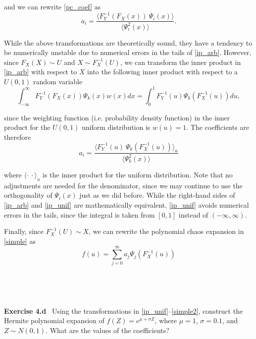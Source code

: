 \documentclass[11pt]{article}
\numberwithin{equation}{section}
\begin{document}
and we can rewrite \eqref{pc_coef} as
\begin{equation}
a_i = \frac{\langle F_Y^{-1} (F_X(x)) \ \Psi_i(x) \rangle}{\langle \Psi_i^2(x) \rangle}. \label{pc_coef_arb}
\end{equation}

\qquad While the above transformations are theoretically sound, they have a tendency to be numerically unstable due to numerical errors in the tails of \eqref{ip_arb}. However, since $F_X(X) \sim U$ and $X \sim F_X^{-1}(U)$, we can transform the inner product in \eqref{ip_arb} with respect to $X$ into the following inner product with respect to a $U(0, 1)$ random variable
\begin{equation}
\int_{-\infty}^{\infty} F_Y^{-1} (F_X(x)) \Psi_k(x) w(x) dx = \int_{0}^{1} F_Y^{-1} (u) \Psi_k(F_X^{-1}(u)) du, \label{ip_unif}
\end{equation}

since the weighting function (i.e. probability density function) in the inner product for the $U(0,1)$ uniform distribution is $w(u) = 1$. The coefficients are therefore
\begin{equation}
a_i = \frac{\langle F_Y^{-1}(u) \ \Psi_k(F_X^{-1}(u)) \rangle_u}{\langle \Psi_k^2(x) \rangle} \label{pc_coef_unif}
\end{equation}

where $\langle \cdot \ \cdot \rangle_u$ is the inner product for the uniform distribution. Note that no adjustments are needed for the denominator, since we may continue to use the orthogonality of $\Psi_i(x)$ just as we did before. While the right-hand sides of \eqref{ip_arb} and \eqref{ip_unif} are mathematically equivalent, \eqref{ip_unif} avoids numerical errors in the tails, since the integral is taken from $[0, 1]$ instead of $(-\infty, \infty)$.

\qquad Finally, since $F_X^{-1}(U) \sim X$, we can rewrite the polynomial chaos expansion in \eqref{simple} as
\begin{equation}
f(u) = \sum_{j=0}^{\infty}  a_j \Psi_j(F_X^{-1}(u)) \label{simple2}
\end{equation}


\

\

\textbf{Exercise 4.d} \ Using the transformations in \eqref{ip_unif}--\eqref{simple2}, construct the Hermite polynomial expansion of $f(Z) = e^{\mu + \sigma Z}$, where $\mu = 1$, $\sigma = 0.1$, and $Z \sim N(0,1)$. What are the values of the coefficients?
\end{document}
